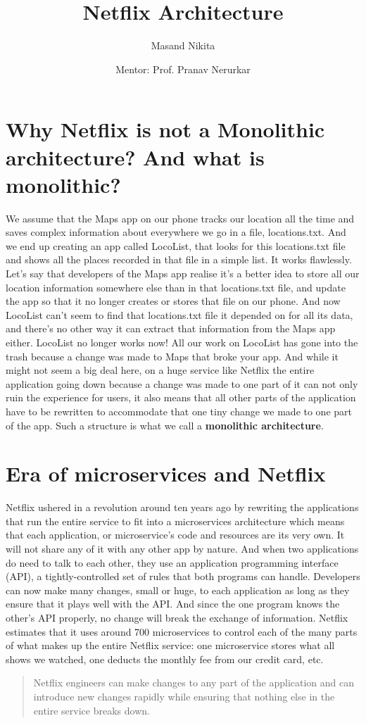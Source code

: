 \documentclass[9pt,twocolumn,twoside]{optica-suppl-materials}
\title{Netflix Architecture}
\author[]{Masand Nikita}
\author[]{Mentor: Prof. Pranav Nerurkar}
\affil[1]{Dept of Computer Engineering and IT, VJTI}
\begin{document}
\maketitle

\section{Why Netflix is not a Monolithic architecture? And what is monolithic?}
We assume that the Maps app on our phone tracks our location all the time and saves complex information about everywhere we go in a file, locations.txt. And we end up creating an app called LocoList, that looks for this locations.txt file and shows all the places recorded in that file in a simple list. It works flawlessly. Let’s say that developers of the Maps app realise it’s a better idea to store all our location information somewhere else than in that locations.txt file, and update the app so that it no longer creates or stores that file on our phone. And now LocoList can’t seem to find that locations.txt file it depended on for all its data, and there’s no other way it can extract that information from the Maps app either. LocoList no longer works now!
All our work on LocoList has gone into the trash because a change was made to Maps that broke your app. And while it might not seem a big deal here, on a huge service like Netflix the entire application going down because a change was made to one part of it can not only ruin the experience for users, it also means that all other parts of the application have to be rewritten to accommodate that one tiny change we made to one part of the app. Such a structure is what we call a \textbf{monolithic architecture}.

\section{Era of microservices and Netflix}
Netflix ushered in a revolution around ten years ago by rewriting the applications that run the entire service to fit into a microservices architecture which means that each application, or microservice’s code and resources are its very own. It will not share any of it with any other app by nature. And when two applications do need to talk to each other, they use an application programming interface (API), a tightly-controlled set of rules that both programs can handle. Developers can now make many changes, small or huge, to each application as long as they ensure that it plays well with the API. And since the one program knows the other’s API properly, no change will break the exchange of information.
Netflix estimates that it uses around 700 microservices to control each of the many parts of what makes up the entire Netflix service: one microservice stores what all shows we watched, one deducts the monthly fee from our credit card, etc.
\begin{quote}
    Netflix engineers can make changes to any part of the application and can introduce new changes rapidly while ensuring that nothing else in the entire service breaks down.
\end{quote}
\end{document}
